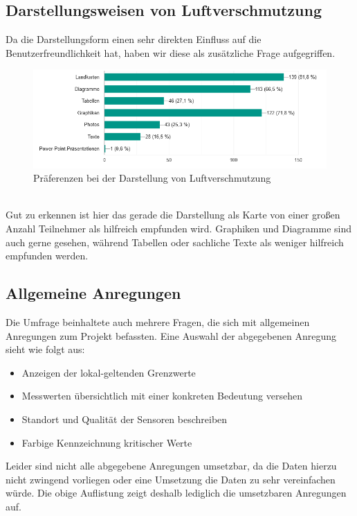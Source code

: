 \subsection{Darstellungsweisen von Luftverschmutzung}
Da die Darstellungsform einen sehr direkten Einfluss auf die Benutzerfreundlichkeit hat, haben wir diese als zusätzliche Frage aufgegriffen.
\\
\begin{figure}[h]
    \centering
    \includegraphics[width=1\textwidth]{media/diagram/darstellung.png}
    \caption{Präferenzen bei der Darstellung von Luftverschmutzung}
\end{figure}
\\
Gut zu erkennen ist hier das gerade die Darstellung als Karte von einer großen Anzahl Teilnehmer als hilfreich empfunden wird.
Graphiken und Diagramme sind auch gerne gesehen, während Tabellen oder sachliche Texte als weniger hilfreich empfunden werden.

\subsection{Allgemeine Anregungen}
Die Umfrage beinhaltete auch mehrere Fragen, die sich mit allgemeinen Anregungen zum Projekt befassten. Eine Auswahl der abgegebenen Anregung sieht wie folgt aus:
\begin{itemize} [noitemsep]
    \item Anzeigen der lokal-geltenden Grenzwerte
    \item Messwerten übersichtlich mit einer konkreten Bedeutung versehen
    \item Standort und Qualität der Sensoren beschreiben
    \item Farbige Kennzeichnung kritischer Werte
\end{itemize}
Leider sind nicht alle abgegebene Anregungen umsetzbar, da die Daten hierzu nicht zwingend vorliegen oder eine Umsetzung die Daten zu sehr vereinfachen würde. Die obige Auflistung zeigt deshalb lediglich die umsetzbaren Anregungen auf.